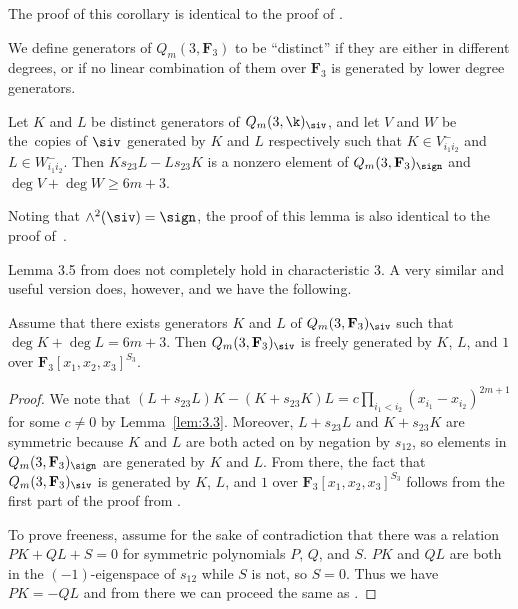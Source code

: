 The proof of this corollary is identical to the proof of \cite[Corollary 3.3]{wang2022explicit}.

We define generators of $Q_m(3,\mathbf{F}_3)$ to be ``distinct'' if they are either in different degrees, or if no linear combination of them over $\mathbf{F}_3$ is generated by lower degree generators.

\begin{Lemma}\label{lem:3.3}
 Let $K$ and $L$ be distinct generators of $Q_m(3,\k)_\siv$, and let $V$ and $W$ be the~copies of $\siv$ generated by $K$ and $L$ respectively such that $K\in V_{i_1i_2}^{-}$ and $L\in W_{i_1i_2}^{-}$. Then $Ks_{23}L - Ls_{23}K$ is a nonzero element of $Q_m(3,\mathbf{F}_3)_{\sign}$ and $\deg V+\deg W\geq 6m+3$.
\end{Lemma}

Noting that $\wedge^2(\siv) = \sign$, the proof of this lemma is also identical to the proof of~\mbox{\cite[Lemma 3.4]{wang2022explicit}}.

Lemma 3.5 from \cite{wang2022explicit} does not completely hold in characteristic $3$. A very similar and useful version does, however, and we have the following.

\begin{Lemma}\label{lem:3.4}
 Assume that there exists generators $K$ and $L$ of $Q_m(3,\mathbf{F}_3)_\siv$ such that $\deg K+\deg L=6m+3$. Then $Q_m(3,\mathbf{F}_3)_\siv$ is freely generated by $K$, $L$, and $1$ over $\mathbf{F}_3[x_1,x_2,x_3]^{S_3}$.
\end{Lemma}
\begin{proof}
 We note that $(L+s_{23}L)K-(K+s_{23}K)L=c\prod_{i_1<i_2}(x_{i_1}-x_{i_2})^{2m+1}$ for some $c\neq 0$ by Lemma~\ref{lem:3.3}. Moreover, $L+s_{23}L$ and $K+s_{23}K$ are symmetric because $K$ and $L$ are both acted on by negation by $s_{12}$, so elements in $Q_m(3,\mathbf{F}_3)_{\sign}$ are generated by $K$ and $L$. From there, the fact that $Q_m(3,\mathbf{F}_3)_\siv$ is generated by $K$, $L$, and $1$ over $\mathbf{F}_3[x_1,x_2,x_3]^{S_3}$ follows from the first part of the proof from \cite{wang2022explicit}.

 To prove freeness, assume for the sake of contradiction that there was a relation $PK+QL+S=0$ for symmetric polynomials $P$, $Q$, and $S$. $PK$ and $QL$ are both in the $(-1)$-eigenspace of $s_{12}$ while $S$ is not, so $S=0$. Thus we have $PK=-QL$ and from there we can proceed the same as \cite{wang2022explicit}.

\end{proof}

